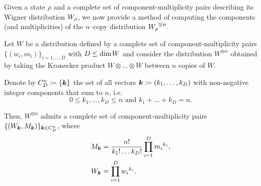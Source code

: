 Given a state $\rho$ and a complete set of component-multiplicity pairs describing its Wigner distribution $\W{\rho}$, we now provide a method of computing the components (and multiplicities) of the $n$--copy distribution $\W{\rho}^{\otimes n}$.
\begin{lemma}\label{lem:ncopycomponents}
	Let $W$ be a distribution defined by a complete set of component-multiplicity pairs $\{(w_i, m_i)\}_{i=1,\dots,D}$ with $D \leq {\rm{dim}}\hspace{1pt}W$ and consider the distribution $W^{\otimes n}$ obtained by taking the Kronecker product $W \otimes \dots \otimes W$ between $n$ copies of $W$.
	
	Denote by $C_D^n \coloneqq \{\bm{k}\}$ the set of all vectors $\bm{k} \coloneqq (k_1, \dots, k_D)$ with non-negative integer components that sum to $n$, i.e.
	\begin{equation*}
	0 \leq k_1, \dots, k_D \leq n \text{ and } k_1 + \dots + k_D = n.
	\end{equation*}
	
	Then, $W^{\otimes n}$ admits a complete set of component-multiplicity pairs $\{(W_{\bm{k}}, M_{\bm{k}})\}_{\bm{k} \in C_D^n}$, where
\begin{align}
	M_{\bm{k}} &= \frac{n!}{k_1!\dots k_D!} \prod\limits_{i=1}^D {m_i}^{k_i}, \label{eq:M}\\
	W_{\bm{k}} &= \prod\limits_{i=1}^D {w_i}^{k_i}. \label{eq:W}
\end{align}
\end{lemma}
